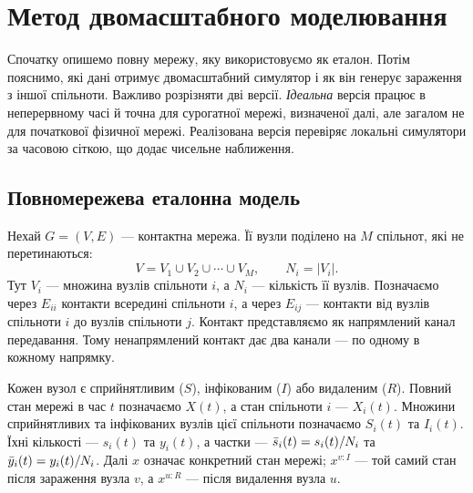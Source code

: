 \clearpage
\section{Метод двомасштабного моделювання}
\label{sec:method}

Спочатку опишемо повну мережу, яку використовуємо як еталон. Потім пояснимо, які дані отримує двомасштабний симулятор і як він генерує зараження з іншої спільноти. Важливо розрізняти дві версії. \emph{Ідеальна} версія працює в неперервному часі й точна для сурогатної мережі, визначеної далі, але загалом не для початкової фізичної мережі. Реалізована версія перевіряє локальні симулятори за часовою сіткою, що додає чисельне наближення.

\subsection{Повномережева еталонна модель}
\label{sec:reference}

Нехай $G=(V,E)$ --- контактна мережа. Її вузли поділено на $M$ спільнот, які не перетинаються:
\begin{equation}
\label{eq:partition}
V=V_1\cup V_2\cup\cdots\cup V_M,
\qquad N_i=|V_i|.
\end{equation}
Тут $V_i$ --- множина вузлів спільноти $i$, а $N_i$ --- кількість її вузлів. Позначаємо через $E_{ii}$ контакти всередині спільноти $i$, а через $E_{ij}$ --- контакти від вузлів спільноти $i$ до вузлів спільноти $j$. Контакт представляємо як напрямлений канал передавання. Тому ненапрямлений контакт дає два канали --- по одному в кожному напрямку.

Кожен вузол є сприйнятливим ($S$), інфікованим ($I$) або видаленим ($R$). Повний стан мережі в час $t$ позначаємо $X(t)$, а стан спільноти $i$ --- $X_i(t)$. Множини сприйнятливих та інфікованих вузлів цієї спільноти позначаємо $S_i(t)$ та $I_i(t)$. Їхні кількості --- $s_i(t)$ та $y_i(t)$, а частки --- $\bar{s}_i(t)=s_i(t)/N_i$ та $\bar{y}_i(t)=y_i(t)/N_i$. Далі $x$ означає конкретний стан мережі; $x^{v:I}$ --- той самий стан після зараження вузла $v$, а $x^{u:R}$ --- після видалення вузла $u$.

